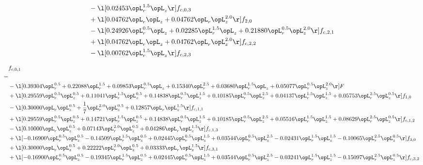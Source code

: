 \begin{alignat}{2}
& - \l[  0.02453 \opL_r^{1.5} \opL_z  \r] f_{c,0,3} \nonumber \\ 
& + \l[  0.04762 \opL_r \opL_z +  0.04762 \opL_r \opL_z^{2.0}  \r] f_{2,0} \nonumber \\ 
& - \l[  0.24926 \opL_r^{0.5} \opL_z +  0.02285 \opL_r^{1.5} \opL_z +  0.21880 \opL_r^{0.5} \opL_z^{2.0}  \r] f_{c,2,1} \nonumber \\ 
& + \l[  0.04762 \opL_r \opL_z +  0.04762 \opL_r \opL_z^{2.0}  \r] f_{c,2,2} \nonumber \\ 
& - \l[  0.00762 \opL_r^{1.5} \opL_z  \r] f_{c,2,3} \nonumber \\ 
\end{alignat} 


\begin{alignat}{2} 
\label{eq:f_01_1} 
& f_{c,0,1} \nonumber \\ 
 = \\ 
& - \l[  0.39304 \opL_r^{0.5} +  0.22088 \opL_r^{1.5} +  0.09853 \opL_r^{0.5} \opL_z +  0.15340 \opL_r^{2.5} +  0.03680 \opL_r^{1.5} \opL_z +  0.05077 \opL_r^{0.5} \opL_z^{2.0}  \r] F \nonumber \\ 
& + \l[  0.29559 \opL_r^{0.5} \opL_z^{0.5} +  0.11041 \opL_r^{1.5} \opL_z^{0.5} +  0.14838 \opL_r^{0.5} \opL_z^{1.5} +  0.10185 \opL_r^{0.5} \opL_z^{2.5} +  0.04137 \opL_r^{1.5} \opL_z^{1.5} +  0.05753 \opL_r^{2.5} \opL_z^{0.5}  \r] f_{1,0} \nonumber \\ 
& - \l[  0.30000 \opL_r \opL_z^{0.5} + \frac{1}{7} \opL_r^{2.0} \opL_z^{0.5} +  0.12857 \opL_r \opL_z^{1.5}  \r] f_{c,1,1} \nonumber \\ 
& + \l[  0.29559 \opL_r^{0.5} \opL_z^{0.5} +  0.14721 \opL_r^{1.5} \opL_z^{0.5} +  0.14838 \opL_r^{0.5} \opL_z^{1.5} +  0.10185 \opL_r^{0.5} \opL_z^{2.5} +  0.05516 \opL_r^{1.5} \opL_z^{1.5} +  0.08629 \opL_r^{2.5} \opL_z^{0.5}  \r] f_{c,1,2} \nonumber \\ 
& - \l[  0.10000 \opL_r \opL_z^{0.5} +  0.07143 \opL_r^{2.0} \opL_z^{0.5} +  0.04286 \opL_r \opL_z^{1.5}  \r] f_{c,1,3} \nonumber \\ 
& + \l[  -0.16900 \opL_r^{0.5} \opL_z^{0.5}   -0.14509 \opL_r^{1.5} \opL_z^{0.5} +  0.02445 \opL_r^{0.5} \opL_z^{1.5} +  0.03544 \opL_r^{0.5} \opL_z^{2.5}   -0.02431 \opL_r^{1.5} \opL_z^{1.5}   -0.10065 \opL_r^{2.5} \opL_z^{0.5}  \r] f_{3,0} \nonumber \\ 
& + \l[  0.30000 \opL_r \opL_z^{0.5} +  0.22222 \opL_r^{2.0} \opL_z^{0.5} +  0.03333 \opL_r \opL_z^{1.5}  \r] f_{c,3,1} \nonumber \\ 
& + \l[  -0.16900 \opL_r^{0.5} \opL_z^{0.5}   -0.19345 \opL_r^{1.5} \opL_z^{0.5} +  0.02445 \opL_r^{0.5} \opL_z^{1.5} +  0.03544 \opL_r^{0.5} \opL_z^{2.5}   -0.03241 \opL_r^{1.5} \opL_z^{1.5}   -0.15097 \opL_r^{2.5} \opL_z^{0.5}  \r] f_{c,3,2} \nonumber \\ 

\end{alignat}
